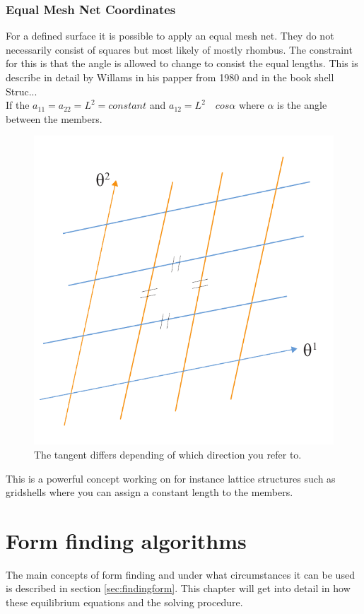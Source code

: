\subsubsection{Equal Mesh Net Coordinates}

For a defined surface it is possible to apply an equal mesh net. They do not necessarily consist of squares but most likely of mostly rhombus. The constraint for this is that the angle is allowed to change to consist the equal lengths. This is describe in detail by Willams in his papper from 1980 and in the book shell Struc...\\
If the $a_{11} = a_{22} = L^2 = constant$ and $a_{12} = L^2\quad cos\alpha$ where $\alpha$ is the angle between the members.\\

\begin{figure}[H]
\centering
\includegraphics[width=0.6\linewidth ]{figure/Theory/equalMeshFrei.pdf}
\caption{The tangent differs depending of which direction you refer to. }
\end{figure}

This is a powerful concept working on for instance lattice structures such as gridshells where you can assign a constant length to the members.




\section{Form finding algorithms}

The main concepts of form finding and under what circumstances it can be used is described in section \ref{sec:findingform}. This chapter will get into detail in how these equilibrium equations and the solving procedure.

